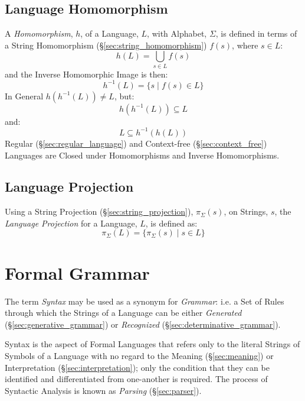 \subsection{Language Homomorphism}\label{sec:language_homomorphism}

A \emph{Homomorphism}, $h$, of a Language, $L$, with Alphabet, $\Sigma$, is
defined in terms of a String Homomorphism (\S\ref{sec:string_homomorphism})
$f(s)$, where $s \in L$:
\[
  h(L) = \bigcup_{s \in L} f(s)
\]
and the Inverse Homomorphic Image is then:
\[
  h^{-1}(L) = \{ s\;|\; f(s) \in L \}
\]
In General $h(h^{-1}(L)) \neq L$, but:
\[
  h (h^{-1}(L)) \subseteq L
\] and:
\[
  L \subseteq h^{-1}(h(L))
\]
Regular (\S\ref{sec:regular_language}) and Context-free
(\S\ref{sec:context_free}) Languages are Closed under Homomorphisms and Inverse
Homomorphisms.



\subsection{Language Projection}\label{sec:language_projection}

Using a String Projection (\S\ref{sec:string_projection}), $\pi_{\Sigma}(s)$, on
Strings, $s$, the \emph{Language Projection} for a Language, $L$, is defined as:
\[
  \pi_{\Sigma}(L) = \{\pi_{\Sigma}(s)\;|\; s \in L\}
\]



\section{Formal Grammar}\label{sec:formal_grammar}

The term \emph{Syntax} may be used as a synonym for \emph{Grammar}: i.e. a Set
of Rules through which the Strings of a Language can be either \emph{Generated}
(\S\ref{sec:generative_grammar}) or \emph{Recognized}
(\S\ref{sec:determinative_grammar}).

Syntax is the aspect of Formal Languages that refers only to the literal Strings
of Symbols of a Language with no regard to the Meaning (\S\ref{sec:meaning}) or
Interpretation (\S\ref{sec:interpretation}); only the condition that they can be
identified and differentiated from one-another is required. The process of
Syntactic Analysis is known as \emph{Parsing} (\S\ref{sec:parser}).



